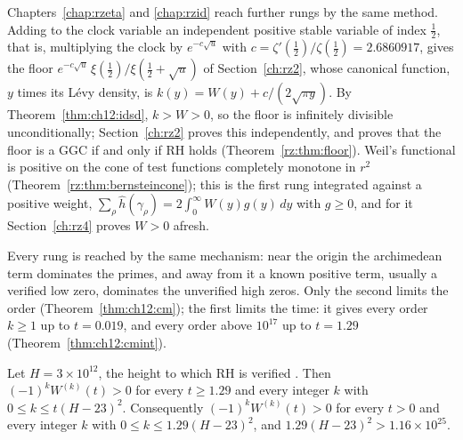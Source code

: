 Chapters~\ref{chap:rzeta} and \ref{chap:rzid} reach further rungs by the same method. Adding to the clock variable an independent positive stable variable of index $\frac12$, that is, multiplying the clock by $e^{-c\sqrt u}$ with $c=\zeta'(\frac12)/\zeta(\frac12)=2.6860917$, gives the floor $e^{-c\sqrt u}\,\xi(\frac12)/\xi(\frac12+\sqrt u)$ of Section~\ref{ch:rz2}, whose canonical function, $y$ times its L\'evy density, is $k(y)=W(y)+c/(2\sqrt{\pi y})$. By Theorem~\ref{thm:ch12:idsd}, $k>W>0$, so the floor is infinitely divisible unconditionally; Section~\ref{ch:rz2} proves this independently, and proves that the floor is a GGC if and only if RH holds (Theorem~\ref{rz:thm:floor}). Weil's functional is positive on the cone of test functions completely monotone in $r^2$ (Theorem~\ref{rz:thm:bernsteincone}); this is the first rung integrated against a positive weight, $\sum_\rho\hat h(\gamma_\rho)=2\int_0^\infty W(y)g(y)\,dy$ with $g\ge0$, and for it Section~\ref{ch:rz4} proves $W>0$ afresh.

Every rung is reached by the same mechanism: near the origin the archimedean term dominates the primes, and away from it a known positive term, usually a verified low zero, dominates the unverified high zeros. Only the second limits the order (Theorem~\ref{thm:ch12:cm}); the first limits the time: it gives every order $k\ge1$ up to $t=0.019$, and every order above $10^{17}$ up to $t=1.29$ (Theorem~\ref{thm:ch12:cmint}).

\begin{theorem}\label{thm:ch12:window}
Let $H=3\times10^{12}$, the height to which RH is verified \cite{PT21}. Then $(-1)^kW^{(k)}(t)>0$ for every $t\ge1.29$ and every integer $k$ with $0\le k\le t(H-23)^2$. Consequently $(-1)^kW^{(k)}(t)>0$ for every $t>0$ and every integer $k$ with $0\le k\le1.29(H-23)^2$, and $1.29(H-23)^2>1.16\times10^{25}$.
\end{theorem}

